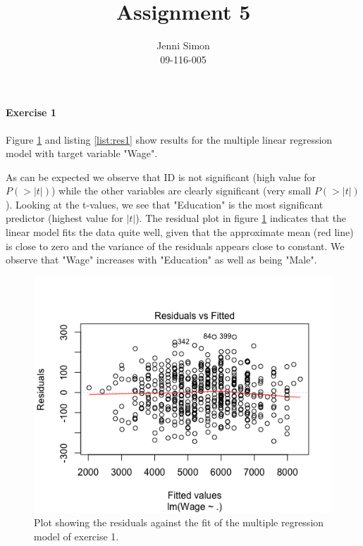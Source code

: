 \documentclass{paper}
\title{Assignment 5}
\author{Jenni Simon\\09-116-005}
\begin{document}
\maketitle


%


\paragraph{Exercise 1}

Figure \ref{fig:res1} and listing \ref{list:res1} show results for the multiple
linear regression model with target variable "Wage".

As can be expected we observe that ID is not significant (high value for $P(>|t|)$) while
the other variables are clearly significant (very small $P(>|t|)$).
Looking at the t-values, we see that "Education" is the most
significant predictor (highest value for $|t|$). The residual plot in figure \ref{fig:res1} indicates that
the linear model fits the data quite well, given that the approximate mean (red line)
is close to zero and the variance of the residuals appears close to constant.
We observe that "Wage" increases with "Education" as well as being "Male". 

\begin{figure}
  \begin{center}
    \quad\quad
    \includegraphics[width=.8\linewidth]{res1}
  \end{center}
  \caption{Plot showing the residuals against the fit of the multiple regression
   model of exercise 1.}
   \label{fig:res1}
\end{figure}
\end{document}
